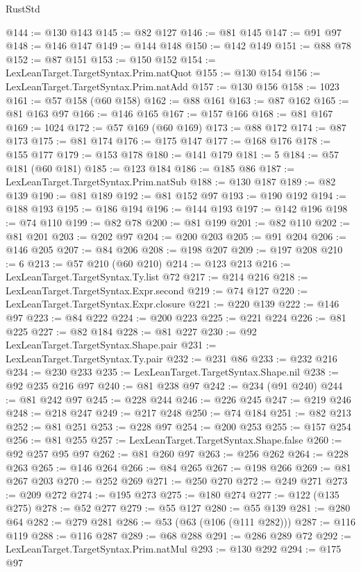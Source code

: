 \begin{lexlean}{RustStd}
\begin{coremodule}
@144 := @130 @143
@145 := @82 @127
@146 := @81 @145
@147 := @91 @97
@148 := @146 @147
@149 := @144 @148
@150 := @142 @149
@151 := @88 @78
@152 := @87 @151
@153 := @150 @152
@154 := LexLeanTarget.TargetSyntax.Prim.natQuot
@155 := @130 @154
@156 := LexLeanTarget.TargetSyntax.Prim.natAdd
@157 := @130 @156
@158 := 1023
@161 := @57 @158 (@60 @158)
@162 := @88 @161
@163 := @87 @162
@165 := @81 @163 @97
@166 := @146 @165
@167 := @157 @166
@168 := @81 @167
@169 := 1024
@172 := @57 @169 (@60 @169)
@173 := @88 @172
@174 := @87 @173
@175 := @81 @174
@176 := @175 @147
@177 := @168 @176
@178 := @155 @177
@179 := @153 @178
@180 := @141 @179
@181 := 5
@184 := @57 @181 (@60 @181)
@185 := @123 @184
@186 := @185 @86
@187 := LexLeanTarget.TargetSyntax.Prim.natSub
@188 := @130 @187
@189 := @82 @139
@190 := @81 @189
@192 := @81 @152 @97
@193 := @190 @192
@194 := @188 @193
@195 := @186 @194
@196 := @144 @193
@197 := @142 @196
@198 := @74 @110
@199 := @82 @78
@200 := @81 @199
@201 := @82 @110
@202 := @81 @201
@203 := @202 @97
@204 := @200 @203
@205 := @91 @204
@206 := @146 @205
@207 := @84 @206
@208 := @198 @207
@209 := @197 @208
@210 := 6
@213 := @57 @210 (@60 @210)
@214 := @123 @213
@216 := LexLeanTarget.TargetSyntax.Ty.list @72
@217 := @214 @216
@218 := LexLeanTarget.TargetSyntax.Expr.second
@219 := @74 @127
@220 := LexLeanTarget.TargetSyntax.Expr.closure
@221 := @220 @139
@222 := @146 @97
@223 := @84 @222
@224 := @200 @223
@225 := @221 @224
@226 := @81 @225
@227 := @82 @184
@228 := @81 @227
@230 := @92 LexLeanTarget.TargetSyntax.Shape.pair
@231 := LexLeanTarget.TargetSyntax.Ty.pair
@232 := @231 @86
@233 := @232 @216
@234 := @230 @233
@235 := LexLeanTarget.TargetSyntax.Shape.nil
@238 := @92 @235 @216 @97
@240 := @81 @238 @97
@242 := @234 (@91 @240)
@244 := @81 @242 @97
@245 := @228 @244
@246 := @226 @245
@247 := @219 @246
@248 := @218 @247
@249 := @217 @248
@250 := @74 @184
@251 := @82 @213
@252 := @81 @251
@253 := @228 @97
@254 := @200 @253
@255 := @157 @254
@256 := @81 @255
@257 := LexLeanTarget.TargetSyntax.Shape.false
@260 := @92 @257 @95 @97
@262 := @81 @260 @97
@263 := @256 @262
@264 := @228 @263
@265 := @146 @264
@266 := @84 @265
@267 := @198 @266
@269 := @81 @267 @203
@270 := @252 @269
@271 := @250 @270
@272 := @249 @271
@273 := @209 @272
@274 := @195 @273
@275 := @180 @274
@277 := @122 (@135 @275)
@278 := @52 @277
@279 := @55 @127
@280 := @55 @139
@281 := @280 @64
@282 := @279 @281
@286 := @53 (@63 (@106 (@111 @282)))
@287 := @116 @119
@288 := @116 @287
@289 := @68 @288
@291 := @286 @289 @72
@292 := LexLeanTarget.TargetSyntax.Prim.natMul
@293 := @130 @292
@294 := @175 @97

\end{coremodule}
\end{lexlean}
